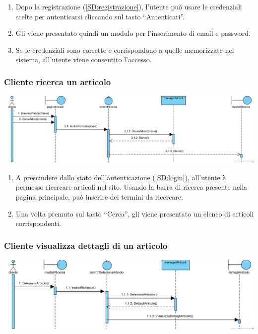 \documentclass[12pt,a4paper]{article}
\begin{document}
\begin{enumerate}
\item Dopo la registrazione (\ref{SD:registrazione}), l'utente può usare le credenziali scelte per autenticarsi cliccando sul tasto ``Autenticati''.
\item Gli viene presentato quindi un modulo per l'inserimento di email e password.
\item Se le credenziali sono corrette e corrispondono a quelle memorizzate nel sistema, all'utente viene consentito l'accesso.
\end{enumerate}

\subsubsection{Cliente ricerca un articolo}
\label{SD:ricerca}

\begin{center}
\includegraphics[width=\textwidth]{SequenceDiagram/ClienteArticoloRicerca}
\end{center}

\begin{enumerate}
\item A prescindere dallo stato dell'autenticazione (\ref{SD:login}), all'utente è permesso ricercare articoli nel sito. Usando la barra di ricerca presente nella pagina principale, può inserire dei termini da ricercare.
\item Una volta premuto sul tasto ``Cerca'', gli viene presentato un elenco di articoli corrispondenti.
\end{enumerate}

\subsubsection{Cliente visualizza dettagli di un articolo}
\label{SD:dettagli}

\begin{center}
\includegraphics[width=\textwidth]{SequenceDiagram/ClienteArticoloSeleziona}
\end{center}
\end{document}
